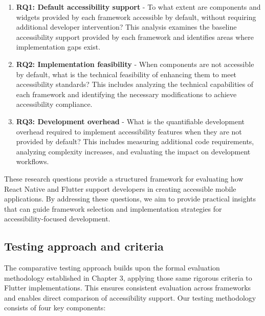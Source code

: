 \begin{enumerate}
    \item \textbf{RQ1: Default accessibility support} - To what extent are components and widgets provided by each framework accessible by default, without requiring additional developer intervention? This analysis examines the baseline accessibility support provided by each framework and identifies areas where implementation gaps exist.
    
    \item \textbf{RQ2: Implementation feasibility} - When components are not accessible by default, what is the technical feasibility of enhancing them to meet accessibility standards? This includes analyzing the technical capabilities of each framework and identifying the necessary modifications to achieve accessibility compliance.
    
    \item \textbf{RQ3: Development overhead} - What is the quantifiable development overhead required to implement accessibility features when they are not provided by default? This includes measuring additional code requirements, analyzing complexity increases, and evaluating the impact on development workflows.
\end{enumerate}

These research questions provide a structured framework for evaluating how React Native and Flutter support developers in creating accessible mobile applications. By addressing these questions, we aim to provide practical insights that can guide framework selection and implementation strategies for accessibility-focused development.

\subsection{Testing approach and criteria}

The comparative testing approach builds upon the formal evaluation methodology established in Chapter 3, applying those same rigorous criteria to Flutter implementations. This ensures consistent evaluation across frameworks and enables direct comparison of accessibility support. Our testing methodology consists of four key components:

